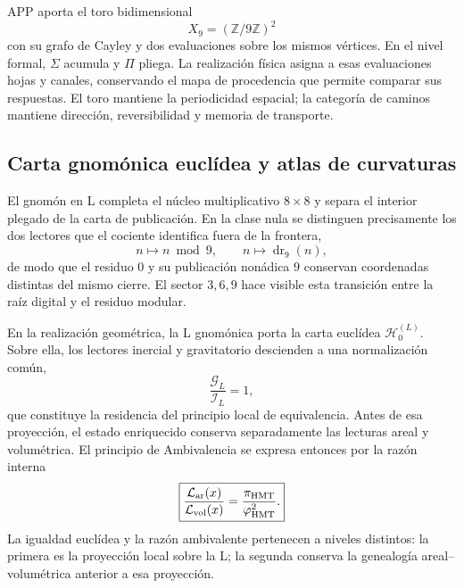 APP aporta el toro bidimensional
\[
 X_9=(\mathbb Z/9\mathbb Z)^2
\]
con su grafo de Cayley y dos evaluaciones sobre los mismos vértices. En el
nivel formal, \(\Sigma\) acumula y \(\Pi\) pliega. La realización física
asigna a esas evaluaciones hojas y canales, conservando el mapa de
procedencia que permite comparar sus respuestas. El toro mantiene la
periodicidad espacial; la categoría de caminos mantiene dirección,
reversibilidad y memoria de transporte.

\subsection{Carta gnomónica euclídea y atlas de curvaturas}
\label{sec:carta-gnomonica-equivalencia-ads-ds}

El gnomón en L completa el núcleo multiplicativo \(8\times8\) y separa el
interior plegado de la carta de publicación. En
la clase nula se distinguen precisamente los dos lectores que el cociente
identifica fuera de la frontera,
\[
 n\longmapsto n\bmod 9,
 \qquad
 n\longmapsto\operatorname{dr}_9(n),
\]
de modo que el residuo \(0\) y su publicación nonádica \(9\) conservan
coordenadas distintas del mismo cierre. El sector \(3,6,9\) hace visible
esta transición entre la raíz digital y el residuo modular.

En la realización geométrica, la L gnomónica porta la carta euclídea
\(\mathscr H_0^{(L)}\). Sobre ella, los lectores inercial y gravitatorio
descienden a una normalización común,
\[
 \frac{\mathcal G_{L}}{\mathcal I_{L}}=1,
\]
que constituye la residencia del principio local de equivalencia. Antes de
esa proyección, el estado enriquecido conserva separadamente las lecturas
areal y volumétrica. El principio de Ambivalencia se expresa entonces por
la razón interna
\[
 \boxed{
 \frac{\mathcal L_{\rm ar}(x)}{\mathcal L_{\rm vol}(x)}
 =\frac{\pi_{\rm HMT}}{\varphi_{\rm HMT}^{2}}.}
\]
La igualdad euclídea y la razón ambivalente pertenecen a niveles distintos:
la primera es la proyección local sobre la L; la segunda conserva la
genealogía areal--volumétrica anterior a esa proyección.

